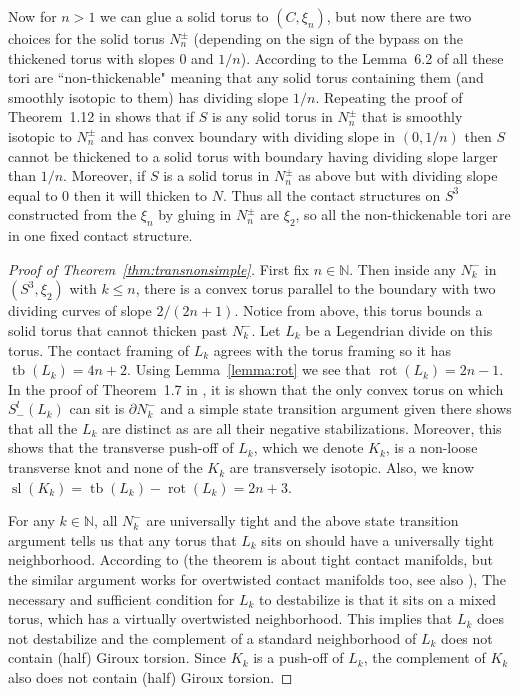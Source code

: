 \documentclass[11pt]{amsart}
\theoremstyle{plain}
\theoremstyle{definition}
\theoremstyle{remark}
\numberwithin{theorem}{section}
\DeclareMathOperator\tb{tb}                   %
\DeclareMathOperator\rot{rot}                 %
\DeclareMathOperator\self{sl}                 %
\begin{document}
Now for $n>1$ we can glue a solid torus to $(C,\xi_n)$, but now there are two choices for the solid torus $N_n^\pm$ (depending on the sign of the bypass on the thickened torus with slopes $0$ and $1/n$). According to the Lemma~6.2 of \cite{EtnyreMinMukherjee22pre} all these tori are ``non-thickenable" meaning that any solid torus containing them (and smoothly isotopic to them) has dividing slope $1/n$. Repeating the proof of Theorem~1.12 in \cite{EtnyreLaFountainTosun12} shows that if $S$ is any solid torus in $N_n^\pm$ that is smoothly isotopic to $N_n^\pm$ and has convex boundary with dividing slope in $(0,1/n)$ then $S$ cannot be thickened to a solid torus with boundary having dividing slope larger than $1/n$. Moreover, if $S$ is a solid torus in $N_n^\pm$ as above but with dividing slope equal to $0$ then it will thicken to $N$. Thus all the contact structures on $S^3$ constructed from the $\xi_n$ by gluing in $N_n^\pm$ are $\xi_2$, so all the non-thickenable tori are in one fixed contact structure. 

\begin{proof}[Proof of Theorem~\ref{thm:transnonsimple}]
First fix $n \in \mathbb{N}$. Then inside any $N_k^-$ in $(S^3,\xi_2)$ with $k\leq n$, there is a convex torus parallel to the boundary with two dividing curves of slope $2/(2n+1)$. Notice from above, this torus bounds a solid torus that cannot thicken past $N_k^-$. Let $L_k$ be a Legendrian divide on this torus. The contact framing of $L_k$ agrees with the torus framing so it has $\tb(L_k)=4n+2$. Using Lemma~\ref{lemma:rot} we see that $\rot(L_k)=2n-1$. In the proof of Theorem~1.7 in \cite{EtnyreLaFountainTosun12}, it is shown that the only convex torus on which $S_-^l(L_k)$ can sit is $\partial N_k^-$ and a simple state transition argument given there shows that all the $L_k$ are distinct as are all their negative stabilizations. Moreover, this shows that the transverse push-off of $L_k$, which we denote $K_k$, is a non-loose transverse knot and none of the $K_k$ are transversely isotopic. Also, we know $\self(K_k)=\tb(L_k)-\rot(L_k)=2n+3$. 

For any $k \in \mathbb{N}$, all $N_k^-$ are universally tight and the above state transition argument tells us that any torus that $L_k$ sits on should have a universally tight neighborhood. According to \cite[Theorem~1.10]{ChakrabortyEtnyreMin20Pre} (the theorem is about tight contact manifolds, but the similar argument works for overtwisted contact manifolds too, see also \cite{McCullough18}), The necessary and sufficient condition for $L_k$ to destabilize is that it sits on a mixed torus, which has a virtually overtwisted neighborhood. This implies that $L_k$ does not destabilize and the complement of a standard neighborhood of $L_k$ does not contain (half) Giroux torsion. Since $K_k$ is a push-off of $L_k$, the complement of $K_k$ also does not contain (half) Giroux torsion.
\end{proof}
\end{document}
